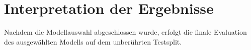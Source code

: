 



\section{Interpretation der Ergebnisse}

Nachdem die Modellauswahl abgeschlossen wurde, erfolgt die finale Evaluation des ausgewählten Modells auf dem unberührten Testsplit.

